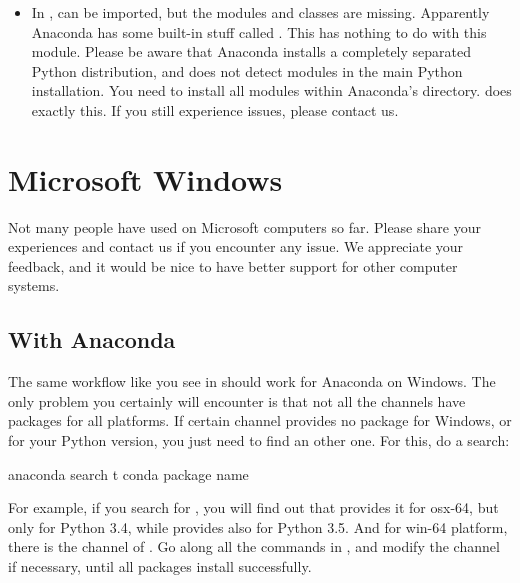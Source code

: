 \documentclass[letterpaper,10pt,english]{sphinxmanual}
\begin{document}
\begin{itemize}
\item {} 
In ,  can be imported, but the modules and classes are
missing. Apparently Anaconda has some built-in stuff called . This
has nothing to do with this module. Please be aware that Anaconda installs a
completely separated Python distribution, and does not detect modules in the
main Python installation. You need to install all modules within Anaconda’s
directory.  does exactly this. If you still
experience issues, please contact us.

\end{itemize}


\section{Microsoft Windows}
\label{\detokenize{index:microsoft-windows}}
Not many people have used  on Microsoft computers so far. Please share
your experiences and contact us if you encounter any issue. We appreciate
your feedback, and it would be nice to have better support for other computer
systems.


\subsection{With Anaconda}
\label{\detokenize{index:with-anaconda}}
The same workflow like you see in  should work for
Anaconda on Windows. The only problem you certainly will encounter is that not
all the channels have packages for all platforms. If certain channel provides
no package for Windows, or for your Python version, you just need to find an
other one. For this, do a search:

\begin{sphinxVerbatim}[commandchars=\\\{\}]
anaconda search \PYGZhy{}t conda \PYGZlt{}package name\PYGZgt{}
\end{sphinxVerbatim}

For example, if you search for , you will find out that 
provides it for osx-64, but only for Python 3.4, while  provides
also for Python 3.5. And for win-64 platform, there is the channel of
. Go along all the commands in , and
modify the channel if necessary, until all packages install successfully.
\end{document}
